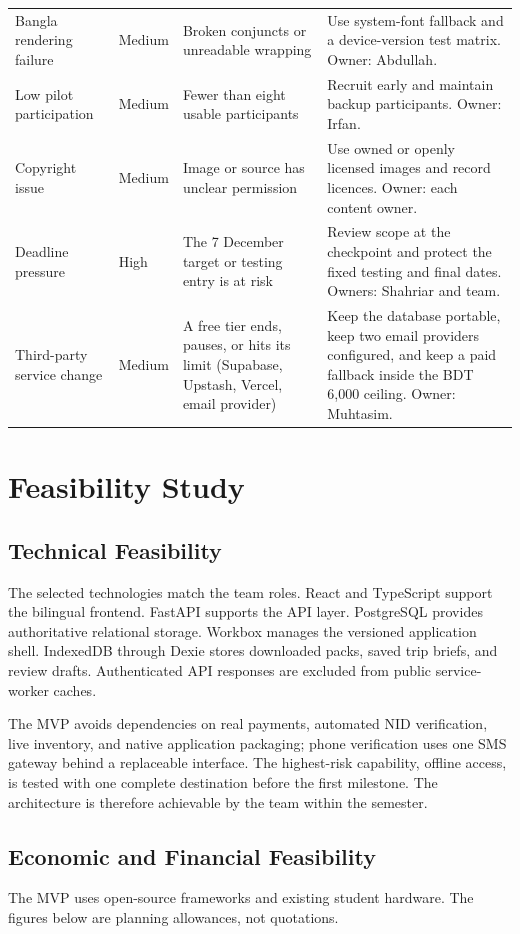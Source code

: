 \documentclass[11pt,a4paper]{article}
\begin{document}
{\begin{longtable}{L{30mm}C{13mm}L{39mm}L{59mm}}
Bangla rendering failure & Medium & Broken conjuncts or unreadable wrapping & Use system-font fallback and a device-version test matrix. Owner: Abdullah. \\
Low pilot participation & Medium & Fewer than eight usable participants & Recruit early and maintain backup participants. Owner: Irfan. \\
Copyright issue & Medium & Image or source has unclear permission & Use owned or openly licensed images and record licences. Owner: each content owner. \\
Deadline pressure & High & The 7 December target or testing entry is at risk & Review scope at the checkpoint and protect the fixed testing and final dates. Owners: Shahriar and team. \\
Third-party service change & Medium & A free tier ends, pauses, or hits its limit (Supabase, Upstash, Vercel, email provider) & Keep the database portable, keep two email providers configured, and keep a paid fallback inside the BDT 6,000 ceiling. Owner: Muhtasim. \\
\end{longtable}
}

\section{Feasibility Study}
\subsection{Technical Feasibility}
The selected technologies match the team roles. React and TypeScript support the bilingual frontend. FastAPI supports the API layer. PostgreSQL provides authoritative relational storage. Workbox manages the versioned application shell. IndexedDB through Dexie stores downloaded packs, saved trip briefs, and review drafts. Authenticated API responses are excluded from public service-worker caches.

The MVP avoids dependencies on real payments, automated NID verification, live inventory, and native application packaging; phone verification uses one SMS gateway behind a replaceable interface. The highest-risk capability, offline access, is tested with one complete destination before the first milestone. The architecture is therefore achievable by the team within the semester.

\subsection{Economic and Financial Feasibility}
The MVP uses open-source frameworks and existing student hardware. The figures below are planning allowances, not quotations.
\end{document}
